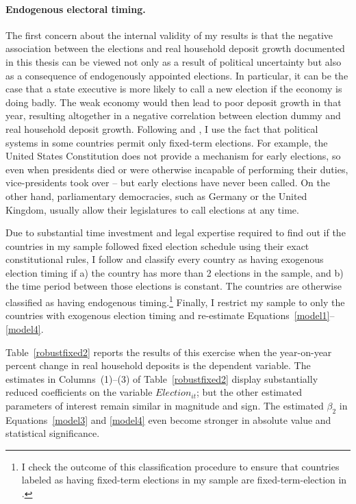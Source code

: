\documentclass[12pt,a4paper]{article}
\begin{document}
\paragraph{Endogenous electoral timing.} The first concern about the internal validity of my results is that the negative association between the elections and real household deposit growth documented in this thesis can be viewed not only as a result of political uncertainty but also as a consequence of endogenously appointed elections. In particular, it can be the case that a state executive is more likely to call a new election if the economy is doing badly. The weak economy would then lead to poor deposit growth in that year, resulting altogether in a negative correlation between election dummy and real household deposit growth. Following \citet{li2018national} and \cite{julio2012political}, I use the fact that political systems in some countries permit only fixed-term elections. For example, the United States Constitution does not provide a mechanism for early elections, so even when presidents died or were otherwise incapable of performing their duties, vice-presidents took over -- but early elections have never been called. On the other hand, parliamentary democracies, such as Germany or the United Kingdom, usually allow their legislatures to call elections at any time.

Due to substantial time investment and legal expertise required to find out if the countries in my sample followed fixed election schedule using their exact constitutional rules, I follow \citet{julio2012political} and classify every country as having exogenous election timing if a) the country has more than 2 elections in the sample, and b) the time period between those elections is constant. The countries are otherwise classified as having endogenous timing.\footnote{I check the outcome of this classification procedure to ensure that countries labeled as having fixed-term elections in my sample are fixed-term-election in \citet{julio2012political}.} Finally, I restrict my sample to only the countries with exogenous election timing and re-estimate Equations~\eqref{model1}--\eqref{model4}.

Table~\ref{robustfixed2} reports the results of this exercise when the year-on-year percent change in real household deposits is the dependent variable. The estimates in Columns~(1)--(3) of Table~\ref{robustfixed2} display substantially reduced coefficients on the variable $Election_{it}$; but the other estimated parameters of interest remain similar in magnitude and sign. The estimated $\beta_2$ in Equations~\eqref{model3} and \eqref{model4} even become stronger in absolute value and statistical significance.
\end{document}
